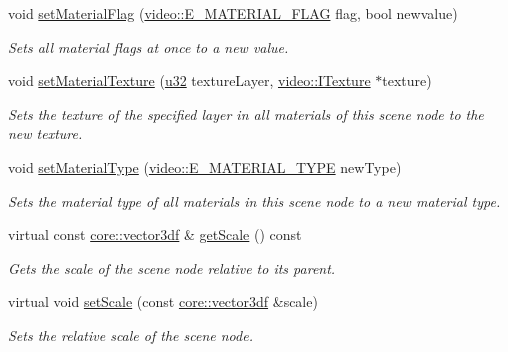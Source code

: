 \begin{DoxyCompactItemize}
void \hyperlink{classirr_1_1scene_1_1ISceneNode_a2841d5077854b9981711a403f33762cd}{set\+Material\+Flag} (\hyperlink{namespaceirr_1_1video_a8a3bc00ae8137535b9fbc5f40add70d3}{video\+::\+E\+\_\+\+M\+A\+T\+E\+R\+I\+A\+L\+\_\+\+F\+L\+AG} flag, bool newvalue)
\begin{DoxyCompactList}\small\item\em Sets all material flags at once to a new value. \end{DoxyCompactList}\item 
void \hyperlink{classirr_1_1scene_1_1ISceneNode_a0d5d2e05ebe08e6a432fbb4fd1d28dd0}{set\+Material\+Texture} (\hyperlink{namespaceirr_a0416a53257075833e7002efd0a18e804}{u32} texture\+Layer, \hyperlink{classirr_1_1video_1_1ITexture}{video\+::\+I\+Texture} $\ast$texture)
\begin{DoxyCompactList}\small\item\em Sets the texture of the specified layer in all materials of this scene node to the new texture. \end{DoxyCompactList}\item 
void \hyperlink{classirr_1_1scene_1_1ISceneNode_a302c7dedd776b52111823df5ed8446de}{set\+Material\+Type} (\hyperlink{namespaceirr_1_1video_ac8e9b6c66f7cebabd1a6d30cbc5430f1}{video\+::\+E\+\_\+\+M\+A\+T\+E\+R\+I\+A\+L\+\_\+\+T\+Y\+PE} new\+Type)
\begin{DoxyCompactList}\small\item\em Sets the material type of all materials in this scene node to a new material type. \end{DoxyCompactList}\item 
virtual const \hyperlink{namespaceirr_1_1core_ae6e2b2a6c552833ebbd5b7463d03586b}{core\+::vector3df} \& \hyperlink{classirr_1_1scene_1_1ISceneNode_a97a5963f8b7b3cdf6fa196863c641c1d}{get\+Scale} () const
\begin{DoxyCompactList}\small\item\em Gets the scale of the scene node relative to its parent. \end{DoxyCompactList}\item 
virtual void \hyperlink{classirr_1_1scene_1_1ISceneNode_a1d710e1e20546bd89affe09fa943b0e2}{set\+Scale} (const \hyperlink{namespaceirr_1_1core_ae6e2b2a6c552833ebbd5b7463d03586b}{core\+::vector3df} \&scale)
\begin{DoxyCompactList}\small\item\em Sets the relative scale of the scene node. \end{DoxyCompactList}\item 

\end{DoxyCompactItemize}

